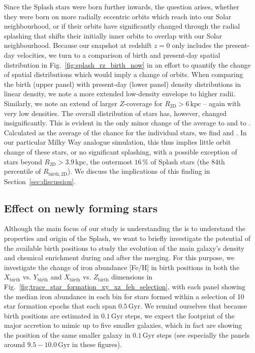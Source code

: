 \documentclass[fleqn,usenatbib]{mnras}
\begin{document}
Since the Splash stars were born further inwards, the question arises, whether they were born on more radially eccentric orbits which reach into our Solar neighbourhood, or if their orbits have significantly changed through the radial splashing that shifts their initially inner orbits to overlap with our Solar neighbourhood. Because our snapshot at redshift $z = 0$ only includes the present-day velocities, we turn to a comparison of birth and present-day spatial distribution in Fig.~\ref{fig:splash_rz_birth_now} in an effort to quantify the change of spatial distributions which would imply a change of orbits. When comparing the birth (upper panel) with present-day (lower panel) density distributions in linear density, we note a more extended low-density envelope to higher radii. Similarly, we note an extend of larger $Z$-coverage for $R_\mathrm{2D} > 6\,\mathrm{kpc}$ -- again with very low densities. The overall distribution of stars has, however, changed insignificantly. This is evident in the only minor change of the average  to  and  to . Calculated as the average of the chance for the individual stars, we find  and . In our particular Milky Way analogue simulation, this thus implies little orbit change of these stars, or no significant splashing, with a possible exception of stars beyond $R_\mathrm{2D} > 3.9\,\mathrm{kpc}$, the outermost $16\,\mathrm{\%}$ of Splash stars (the 84th percentile of $R_\mathrm{birth,2D}$). We discuss the implications of this finding in Section~\ref{sec:discussion}.

\subsection{Effect on newly forming stars}

Although the main focus of our study is understanding the is to understand the properties and origin of the Splash, we want to briefly investigate the potential of the available birth positions to study the evolution of the main galaxy's density and chemical enrichment during and after the merging. For this purpose, we investigate the change of iron abundance [Fe/H] in birth positions in both the $X_\mathrm{birth}$ vs. $Y_\mathrm{birth}$ and $X_\mathrm{birth}$ vs. $Z_\mathrm{birth}$ dimensions in Fig.~\ref{fig:trace_star_formation_xy_xz_feh_selection}, with each panel showing the median iron abundance in each bin for stars formed within a selection of 10 star formation epochs that each span $0.5\,\mathrm{Gyr}$. We remind ourselves that because birth positions are estimated in $0.1\,\mathrm{Gyr}$ steps, we expect the footprint of the major accretion to mimic up to five smaller galaxies, which in fact are showing the position of the same smaller galaxy in $0.1\,\mathrm{Gyr}$ steps (see especially the panels around $9.5-10.0\,\mathrm{Gyr}$ in these figures).
\end{document}
